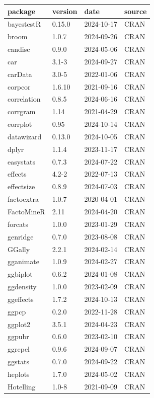 \documentclass[
  letterpaper,
  10pt,
  krantz2]{krantz}
\begin{document}
\begin{longtable}[]{@{}llll@{}}
\toprule\noalign{}
package & version & date & source \\
\midrule\noalign{}
\endhead
\bottomrule\noalign{}
\endlastfoot
bayestestR & 0.15.0 & 2024-10-17 & CRAN \\
broom & 1.0.7 & 2024-09-26 & CRAN \\
candisc & 0.9.0 & 2024-05-06 & CRAN \\
car & 3.1-3 & 2024-09-27 & CRAN \\
carData & 3.0-5 & 2022-01-06 & CRAN \\
corpcor & 1.6.10 & 2021-09-16 & CRAN \\
correlation & 0.8.5 & 2024-06-16 & CRAN \\
corrgram & 1.14 & 2021-04-29 & CRAN \\
corrplot & 0.95 & 2024-10-14 & CRAN \\
datawizard & 0.13.0 & 2024-10-05 & CRAN \\
dplyr & 1.1.4 & 2023-11-17 & CRAN \\
easystats & 0.7.3 & 2024-07-22 & CRAN \\
effects & 4.2-2 & 2022-07-13 & CRAN \\
effectsize & 0.8.9 & 2024-07-03 & CRAN \\
factoextra & 1.0.7 & 2020-04-01 & CRAN \\
FactoMineR & 2.11 & 2024-04-20 & CRAN \\
forcats & 1.0.0 & 2023-01-29 & CRAN \\
genridge & 0.7.0 & 2023-08-08 & CRAN \\
GGally & 2.2.1 & 2024-02-14 & CRAN \\
gganimate & 1.0.9 & 2024-02-27 & CRAN \\
ggbiplot & 0.6.2 & 2024-01-08 & CRAN \\
ggdensity & 1.0.0 & 2023-02-09 & CRAN \\
ggeffects & 1.7.2 & 2024-10-13 & CRAN \\
ggpcp & 0.2.0 & 2022-11-28 & CRAN \\
ggplot2 & 3.5.1 & 2024-04-23 & CRAN \\
ggpubr & 0.6.0 & 2023-02-10 & CRAN \\
ggrepel & 0.9.6 & 2024-09-07 & CRAN \\
ggstats & 0.7.0 & 2024-09-22 & CRAN \\
heplots & 1.7.0 & 2024-05-02 & CRAN \\
Hotelling & 1.0-8 & 2021-09-09 & CRAN \\

\end{longtable}
\end{document}
